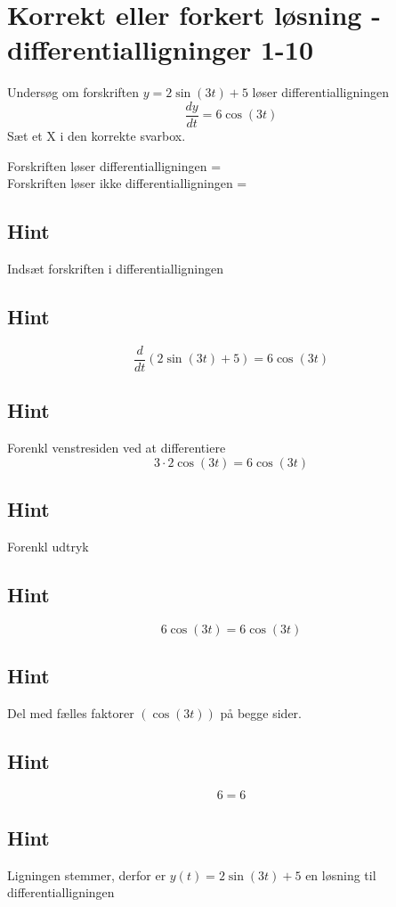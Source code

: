 \documentclass{article}
\newenvironment{exercise}[1]{\newpage\section{#1}}{}
\newcommand{\answerbox}[1]{\fbox{$#1$}}
\newcommand{\hint}{\subsection*{Hint}}
\begin{document}
\begin{exercise}{Korrekt eller forkert løsning - differentialligninger 1-10}
	
	
	Undersøg om forskriften $y = 2 \sin(3t) + 5$ løser differentialligningen
	\[
	\frac{dy}{dt} = 6 \cos(3t)
	\]
	Sæt et X i den korrekte svarbox.
	
	Forskriften løser differentialligningen = \answerbox{X} \\
	
	Forskriften løser ikke differentialligningen = \answerbox{}
	
	\hint
	
	Indsæt forskriften i differentialligningen
	
	\hint
	\[
	\frac{d}{dt} \left( 2 \sin(3t) + 5\right) = 6 \cos(3t)
	\]
	
	
	\hint
	
	Forenkl venstresiden ved at differentiere
	\[
	3	\cdot 2 \cos(3t) = 6 \cos(3t)
	\]
	
	\hint
	
	Forenkl udtryk
		
	\hint
	\[
	6 \cos(3t) = 6 \cos(3t)
	\]
	
	\hint
	Del med fælles faktorer $\left(\cos(3t)\right)$ på begge sider.
	
	\hint
	
	\[
	6 = 6
	\]
	
	
	\hint
	
	Ligningen stemmer, derfor er $y(t) = 2 \sin(3t) + 5$  en løsning til differentialligningen
	
\end{exercise}

\newpage
\end{document}
